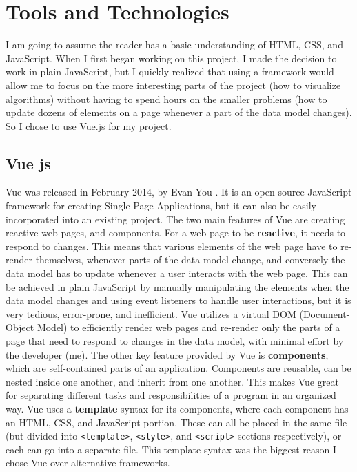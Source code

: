 \chapter{Tools and Technologies}
\label{tools-and-technologies}
I am going to assume the reader has a basic understanding of HTML, CSS, and JavaScript.
When I first began working on this project, I made the decision to work in plain 
JavaScript, but I quickly realized that using a framework would allow me to focus 
on the more interesting parts of the project (how to visualize algorithms) without 
having to spend hours on the smaller problems 
(how to update dozens of elements on a page whenever a part of the data model changes).
So I chose to use Vue.js for my project. 
\section{Vue js}
\hspace{-0.25in}Vue was released in February 2014, by Evan You  \cite{vue-launch}. 
It is an open source JavaScript framework
for creating Single-Page Applications, but 
it can also be easily incorporated into an existing project. 
The two main features of Vue are creating reactive web pages, and components.
\newline\newline
For a web page to be \textbf{reactive}, it needs to respond to changes. This means
that various elements of the web page have to re-render themselves, whenever
parts of the data model change, and conversely the data model has to update whenever
a user interacts with the web page. 
This can be achieved in plain JavaScript by manually manipulating the elements
when the data model changes and using event listeners to handle user interactions, 
but it is very tedious, error-prone, and inefficient. 
Vue utilizes a virtual DOM (Document-Object Model) to efficiently 
render web pages and re-render only the parts of a page
that need to respond to changes in the data model, 
with minimal effort by the developer (me).
\newline\newline
The other key feature provided by Vue is \textbf{components}, which are 
self-contained parts of an application. 
Components are reusable, can be nested inside one another, and inherit from one another.
This makes Vue great for separating different tasks and responsibilities
of a program in an organized way. 
Vue uses a \textbf{template} syntax for its components, where each component 
has an HTML, CSS, and JavaScript portion. These can all be placed in the same file 
(but divided into \texttt{<template>}, \texttt{<style>}, and \texttt{<script>} sections respectively),
or each can go into a separate file. 
This template syntax was the biggest reason I chose Vue over alternative frameworks.

